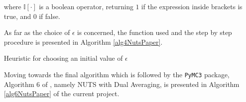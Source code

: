 
\vspace{0.5cm}

where $\mathds{I}[\cdot ]$ is a boolean operator, returning $1$ if the expression inside brackets is true, and $0$ if false.

\newpage

As far as the choice of $\epsilon$ is concerned, the function used and the step by step procedure is presented in Algorithm \ref{alg4NutsPaper}.\\

\begin{algorithm}[H]
    \caption{Heuristic for choosing an initial value of $\epsilon$}
    \label{alg4NutsPaper}
\end{algorithm}


\newpage 

Moving towards the final algorithm which is followed by the \verb|PyMC3| package, Algorithm 6 of \cite{hoffman2014no}, namely \acrfull{NUTS} with Dual Averaging, is presented in Algorithm \ref{alg6NutsPaper} of the current project.\\

